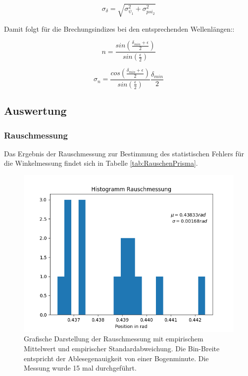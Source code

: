 \documentclass[12pt,a4paper]{article}
\begin{document}
\begin{equation}
\sigma_{\delta} = \sqrt{\sigma_{\psi_1}^2+\sigma_{psi_2}^2}
\end{equation}

Damit folgt für die Brechungsindizes bei den entsprechenden Wellenlängen::

\begin{equation}
n = \frac{sin(\frac{\delta_{min}+\epsilon}{2})}{sin(\frac{\epsilon}{2})}
\end{equation}

\begin{equation}
\sigma_n = \frac{cos(\frac{\delta_{min}+\epsilon}{2})}{sin(\frac{\epsilon}{2})} \frac{\delta_{min}}{2}
\end{equation}


\subsection{Auswertung}

\subsubsection{Rauschmessung}

Das Ergebnis der Rauschmessung zur Bestimmung des statistischen Fehlers für die Winkelmessung findet sich in Tabelle \ref{tab:RauschenPrisma}.

\begin{figure}
\includegraphics[scale=1.0]{Bilder/HistRauschen.png}
\caption{Grafische Darstellung der Rauschmessung mit empirischem Mittelwert und empirischer Standardabweichung. Die Bin-Breite entspricht der Ablesegenauigkeit von einer Bogenminute. Die Messung wurde 15 mal durchgeführt.}
\label{fig:HistRauschen}
\end{figure}
\end{document}

